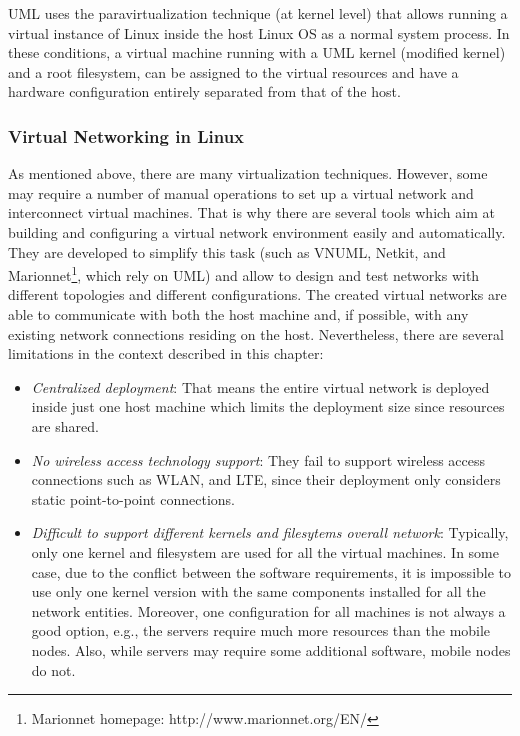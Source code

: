 UML uses the paravirtualization technique (at kernel level) that allows running a virtual instance of Linux inside the host Linux OS as a normal system process. In these conditions, a virtual machine running with a UML kernel (modified kernel) and a root filesystem, can be assigned to the virtual resources and have a hardware configuration entirely separated from that of the host. 

\subsubsection{Virtual Networking in Linux}
As mentioned above, there are many virtualization techniques. However, some may require a number of manual operations to set up a virtual network and interconnect virtual machines. That is why there are several tools which aim at building and configuring a virtual network environment easily and automatically. They are developed to simplify this task (such as VNUML, Netkit, and Marionnet\footnote{Marionnet homepage: http://www.marionnet.org/EN/}, which rely on UML) and allow to design and test networks with different topologies and different configurations. The created virtual networks are able to communicate with both the host machine and, if possible, with any existing network connections residing on the host. 
Nevertheless, there are several limitations in the context described in this chapter:
\begin{itemize}
\item \textit{Centralized deployment}: That means the entire virtual network is deployed inside just one host machine which limits the deployment size since resources are shared. 
\item \textit{No wireless access technology support}: They fail to support wireless access connections such as WLAN, and LTE, since their deployment only considers static point-to-point connections.
\item \textit{Difficult to support different kernels and filesytems overall network}: Typically, only one kernel and filesystem are used for all the virtual machines. In some case, due to the conflict between the software requirements, it is impossible to use only one kernel version with the same components installed for all the network entities. Moreover, one configuration for all machines is not always a good option, e.g., the servers require much more resources than the mobile nodes. Also, while servers may require some additional software, mobile nodes do not.
\end{itemize}

